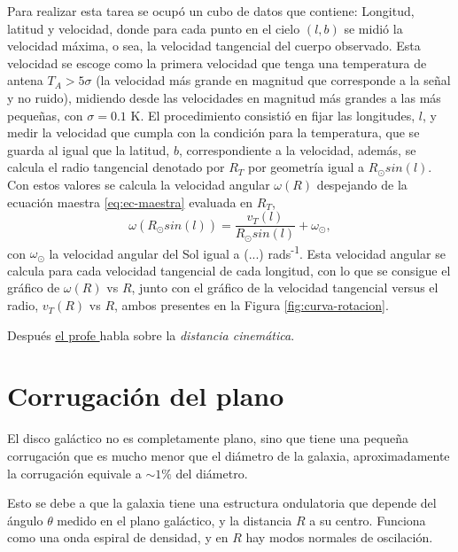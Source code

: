 \documentclass[letterpaper,oneside]{article}
\begin{document}
Para realizar esta tarea se ocupó un cubo de datos que contiene: Longitud, latitud y velocidad, donde para cada punto en el cielo $(l,b)$ se midió la velocidad máxima, o sea, la velocidad tangencial del cuerpo observado. Esta velocidad se escoge como la primera velocidad que tenga una temperatura de antena $T_A>5\sigma$ (la velocidad más grande en magnitud que corresponde a la señal y no ruido), midiendo desde las velocidades en magnitud más grandes a las más pequeñas, con $\sigma =0.1$ \si{\kelvin}. El procedimiento consistió en fijar las longitudes, $l$, y medir la velocidad que cumpla con la condición para la temperatura, que se guarda al igual que la latitud, $b$, correspondiente a la velocidad, además, se calcula el radio tangencial denotado por $R_T$ por geometría igual a $R_{\odot}sin(l)$. Con estos valores se calcula la velocidad angular $\omega(R)$ despejando de la ecuación maestra \ref{eq:ec-maestra} evaluada en $R_T$,
\begin{equation*}
\omega(R_{\odot}sin(l))=\frac{v_T(l)}{R_{\odot}sin(l)}+\omega_{\odot},
\end{equation*}
con $\omega_{\odot}$ la velocidad angular del Sol igual a (...) rads\textsuperscript{-1}. Esta velocidad angular se calcula para cada velocidad tangencial de cada longitud, con lo que se consigue el gráfico de $\omega(R)$ vs $R$, junto con el gráfico de la velocidad tangencial versus el radio, $v_T(R)$ vs $R$, ambos presentes en la Figura \ref{fig:curva-rotacion}.

Después \href{https://www.youtube.com/watch?v=8ISCwe7OM-8}{el profe }habla sobre la \textit{distancia cinemática}.

\section{Corrugación del plano}
El disco galáctico no es completamente plano, sino que tiene una pequeña corrugación que es mucho menor que el diámetro de la galaxia, aproximadamente la corrugación equivale a  $\sim 1\%$ del diámetro.

Esto se debe a que la galaxia tiene una estructura ondulatoria que depende del ángulo $\theta$ medido en el plano galáctico, y la distancia $R$ a su centro. Funciona como una onda espiral de densidad, y en $R$ hay modos normales de oscilación. %
\end{document}
